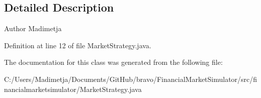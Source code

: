 \subsection{Detailed Description}
\begin{DoxyAuthor}{Author}
Madimetja 
\end{DoxyAuthor}


Definition at line 12 of file Market\+Strategy.\+java.



The documentation for this class was generated from the following file\+:\begin{DoxyCompactItemize}
\item 
C\+:/\+Users/\+Madimetja/\+Documents/\+Git\+Hub/bravo/\+Financial\+Market\+Simulator/src/financialmarketsimulator/Market\+Strategy.\+java\end{DoxyCompactItemize}
